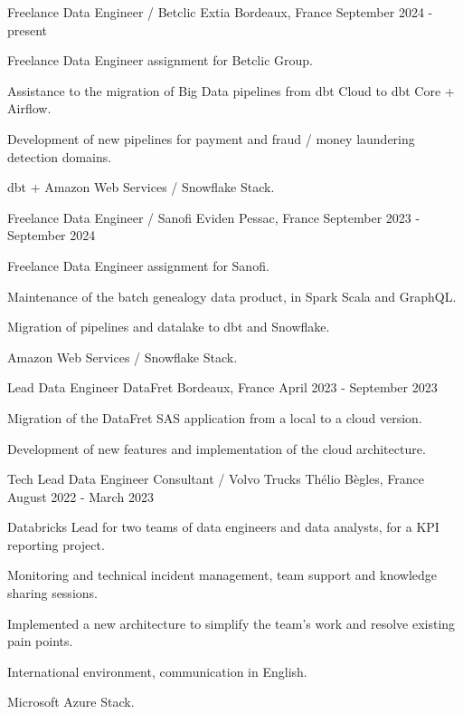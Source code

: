 
\begin{cventries}
	\cventry
	{Freelance Data Engineer / Betclic}
	{Extia}
	{Bordeaux, France}
	{September 2024 - present}
	{
		\begin{cvitems}
			\item {Freelance Data Engineer assignment for Betclic Group.}
			\item {Assistance to the migration of Big Data pipelines from dbt Cloud to dbt Core + Airflow.}
			\item {Development of new pipelines for payment and fraud / money laundering detection domains.}
			\item {dbt + Amazon Web Services / Snowflake Stack.}
		\end{cvitems}
	}
	
	\cventry
	{Freelance Data Engineer / Sanofi}
	{Eviden}
	{Pessac, France}
	{September 2023 - September 2024}
	{
		\begin{cvitems}
			\item {Freelance Data Engineer assignment for Sanofi.}
			\item {Maintenance of the batch genealogy data product, in Spark Scala and GraphQL.}
			\item {Migration of pipelines and datalake to dbt and Snowflake.}
			\item {Amazon Web Services / Snowflake Stack.}
		\end{cvitems}
	}

	\cventry
	{Lead Data Engineer}
	{DataFret}
	{Bordeaux, France}
	{April 2023 - September 2023}
	{
		\begin{cvitems}
			\item {Migration of the DataFret SAS application from a local to a cloud version.}
			\item {Development of new features and implementation of the cloud architecture.}
		\end{cvitems}
	}
	
	\cventry
	{Tech Lead Data Engineer Consultant / Volvo Trucks}
	{Thélio}
	{Bègles, France}
	{August 2022 - March 2023}
	{
		\begin{cvitems}
			\item Databricks Lead for two teams of data engineers and data analysts, for a KPI reporting project.
			\item Monitoring and technical incident management, team support and knowledge sharing sessions.
			\item Implemented a new architecture to simplify the team's work and resolve existing pain points.
			\item International environment, communication in English.
			\item Microsoft Azure Stack.
		\end{cvitems}
	}
	

\end{cventries}
